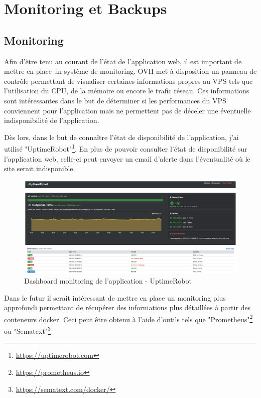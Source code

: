 \section{Monitoring et Backups}

\subsection{Monitoring}
Afin d'être tenu au courant de l'état de l'application web, il est important de mettre en place un système de monitoring. OVH met à disposition un panneau de contrôle permettant de visualiser certaines informations propres au VPS tels que l'utilisation du CPU, de la mémoire ou encore le trafic réseau. Ces informations sont intéressantes dans le but de déterminer si les performances du VPS conviennent pour l'application mais ne permettent pas de déceler une éventuelle indisponibilité de l'application. 

\newpara

Dès lors, dans le but de connaître l'état de disponibilité de l'application, j'ai utilisé "UptimeRobot"\footnote{\url{https://uptimerobot.com}}. En plus de pouvoir consulter l'état de disponibilité sur l'application web, celle-ci peut envoyer un email d'alerte dans l'éventualité où le site serait indisponible.

\begin{figure}[H]
  \centering
  \includegraphics[width=\linewidth]{img/uptimeRobot.png}
  \caption{Dashboard monitoring de l'application - UptimeRobot}
\end{figure}

\newpara

Dans le futur il serait intéressant de mettre en place un monitoring plus approfondi permettant de récupérer des informations plus détaillées à partir des conteneurs docker. Ceci peut être obtenu à l'aide d'outils tels que "Prometheus"\footnote{\url{https://prometheus.io}} ou "Sematext"\footnote{\url{https://sematext.com/docker/}} 

